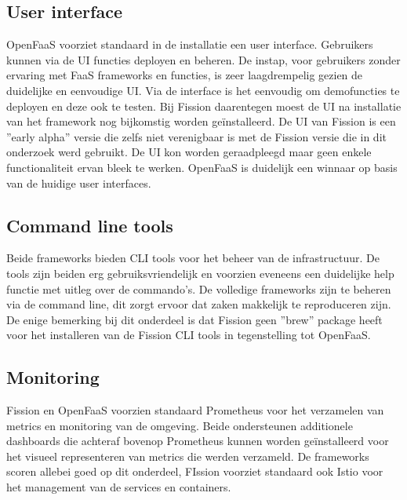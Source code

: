 \subsection{User interface}
OpenFaaS voorziet standaard in de installatie een user interface. Gebruikers kunnen via de UI functies deployen en beheren. De instap, voor gebruikers zonder ervaring met FaaS  frameworks en functies, is zeer laagdrempelig gezien de duidelijke en eenvoudige UI. Via de interface is het eenvoudig om demofuncties te deployen en deze ook te testen. Bij Fission daarentegen moest de UI na installatie van het framework nog bijkomstig worden geïnstalleerd. De UI van Fission is een ''early alpha'' versie die zelfs niet verenigbaar is met de Fission versie die in dit onderzoek werd gebruikt. De UI kon worden geraadpleegd maar geen enkele functionaliteit ervan bleek te werken. OpenFaaS is duidelijk een winnaar op basis van de huidige user interfaces.

\subsection{Command line tools}
Beide frameworks bieden CLI tools voor het beheer van de infrastructuur. De tools zijn beiden erg gebruiksvriendelijk en voorzien eveneens een duidelijke help functie met uitleg over de commando's. De volledige frameworks zijn te beheren via de command line, dit zorgt ervoor dat zaken makkelijk te reproduceren zijn. De enige bemerking bij dit onderdeel is dat Fission geen ''brew'' package heeft voor het installeren van de Fission CLI tools in tegenstelling tot OpenFaaS.

\subsection{Monitoring}
Fission en OpenFaaS voorzien standaard Prometheus voor het verzamelen van metrics en monitoring van de omgeving. Beide ondersteunen additionele dashboards die achteraf bovenop Prometheus kunnen worden geïnstalleerd voor het visueel representeren van metrics die werden verzameld. De frameworks scoren allebei goed op dit onderdeel, FIssion voorziet standaard ook Istio voor het management van de services en containers.

